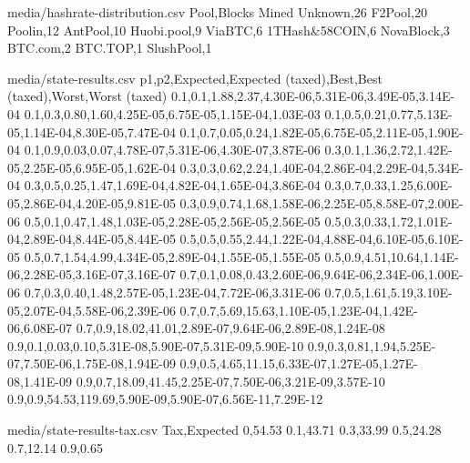 \begin{filecontents*}{media/hashrate-distribution.csv}
Pool,Blocks Mined
Unknown,26
F2Pool,20
Poolin,12
AntPool,10
Huobi.pool,9
ViaBTC,6
1THash\&58COIN,6
NovaBlock,3
BTC.com,2
BTC.TOP,1
SlushPool,1
\end{filecontents*}

\begin{filecontents*}{media/state-results.csv}
p1,p2,Expected,Expected (taxed),Best,Best (taxed),Worst,Worst (taxed)
0.1,0.1,1.88,2.37,4.30E-06,5.31E-06,3.49E-05,3.14E-04
0.1,0.3,0.80,1.60,4.25E-05,6.75E-05,1.15E-04,1.03E-03
0.1,0.5,0.21,0.77,5.13E-05,1.14E-04,8.30E-05,7.47E-04
0.1,0.7,0.05,0.24,1.82E-05,6.75E-05,2.11E-05,1.90E-04
0.1,0.9,0.03,0.07,4.78E-07,5.31E-06,4.30E-07,3.87E-06
0.3,0.1,1.36,2.72,1.42E-05,2.25E-05,6.95E-05,1.62E-04
0.3,0.3,0.62,2.24,1.40E-04,2.86E-04,2.29E-04,5.34E-04
0.3,0.5,0.25,1.47,1.69E-04,4.82E-04,1.65E-04,3.86E-04
0.3,0.7,0.33,1.25,6.00E-05,2.86E-04,4.20E-05,9.81E-05
0.3,0.9,0.74,1.68,1.58E-06,2.25E-05,8.58E-07,2.00E-06
0.5,0.1,0.47,1.48,1.03E-05,2.28E-05,2.56E-05,2.56E-05
0.5,0.3,0.33,1.72,1.01E-04,2.89E-04,8.44E-05,8.44E-05
0.5,0.5,0.55,2.44,1.22E-04,4.88E-04,6.10E-05,6.10E-05
0.5,0.7,1.54,4.99,4.34E-05,2.89E-04,1.55E-05,1.55E-05
0.5,0.9,4.51,10.64,1.14E-06,2.28E-05,3.16E-07,3.16E-07
0.7,0.1,0.08,0.43,2.60E-06,9.64E-06,2.34E-06,1.00E-06
0.7,0.3,0.40,1.48,2.57E-05,1.23E-04,7.72E-06,3.31E-06
0.7,0.5,1.61,5.19,3.10E-05,2.07E-04,5.58E-06,2.39E-06
0.7,0.7,5.69,15.63,1.10E-05,1.23E-04,1.42E-06,6.08E-07
0.7,0.9,18.02,41.01,2.89E-07,9.64E-06,2.89E-08,1.24E-08
0.9,0.1,0.03,0.10,5.31E-08,5.90E-07,5.31E-09,5.90E-10
0.9,0.3,0.81,1.94,5.25E-07,7.50E-06,1.75E-08,1.94E-09
0.9,0.5,4.65,11.15,6.33E-07,1.27E-05,1.27E-08,1.41E-09
0.9,0.7,18.09,41.45,2.25E-07,7.50E-06,3.21E-09,3.57E-10
0.9,0.9,54.53,119.69,5.90E-09,5.90E-07,6.56E-11,7.29E-12
\end{filecontents*}

\begin{filecontents*}{media/state-results-tax.csv}
Tax,Expected
0,54.53
0.1,43.71
0.3,33.99
0.5,24.28
0.7,12.14
0.9,0.65
\end{filecontents*}
